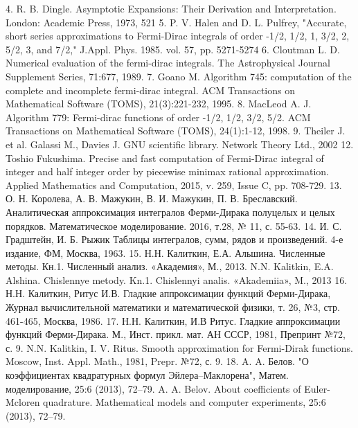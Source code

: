 4. R. B. Dingle. Asymptotic Expansions: Their Derivation and Interpretation.
London: Academic Press, 1973, 521
5. P. V. Halen and D. L. Pulfrey, "Accurate, short series approximations to
Fermi-Dirac integrals of order -1/2, 1/2, 1, 3/2, 2, 5/2, 3, and 7/2," J.Appl.
Phys. 1985. vol. 57, pp. 5271-5274
6. Cloutman L. D. Numerical evaluation of the fermi-dirac integrals. The
Astrophysical Journal Supplement Series, 71:677, 1989.
7. Goano M. Algorithm 745: computation of the complete and incomplete fermi-dirac integral. ACM Transactions on Mathematical Software (TOMS), 21(3):221-232, 1995.
8. MacLeod A. J. Algorithm 779: Fermi-dirac functions of order -1/2, 1/2, 3/2,
5/2. ACM Transactions on Mathematical Software (TOMS), 24(1):1-12,
1998.
9. Theiler J. et al. Galassi M., Davies J. GNU scientific library. Network Theory
Ltd., 2002
12. Toshio Fukushima. Precise and fast computation of Fermi-Dirac integral of
integer and half integer order by piecewise minimax rational approximation.
Applied Mathematics and Computation, 2015, v. 259, Issue C, pp. 708-729.
13. О. Н. Королева, А. В. Мажукин, В. И. Мажукин, П. В. Бреславский.
Аналитическая аппроксимация интегралов Ферми-Дирака полуцелых и
целых порядков. Математическое моделирование. 2016, т.28, № 11, с.
55-63.
14. И. С. Градштейн, И. Б. Рыжик Таблицы интегралов, сумм, рядов и
произведений. 4-е издание, ФМ, Москва, 1963.
15. Н.Н. Калиткин, Е.А. Альшина. Численные методы. Кн.1. Численный
анализ. «Академия», М., 2013. N.N. Kalitkin, E.A.
Alshina. Chislennye metody. Kn.1. Chislennyi analis. «Akademiia», M., 2013
16. Н.Н. Калиткин, Ритус И.В. Гладкие аппроксимации функций
Ферми-Дирака, Журнал вычислительной математики и математической
физики, т. 26, №3, стр. 461-465, Москва, 1986.
17. Н.Н. Калиткин, И.В Ритус. Гладкие аппроксимации функций
Ферми-Дирака. М., Инст. прикл. мат. АН СССР, 1981, Препринт №72,
с. 9.
N.N. Kalitkin, I. V. Ritus. Smooth approximation for Fermi-Dirak functions.
Moscow, Inst. Appl. Math., 1981, Prepr. №72, с. 9.
18. A. A. Белов. "О коэффициентах квадратурных формул
Эйлера–Маклорена", Матем. моделирование, 25:6 (2013), 72–79.
A. A. Belov. About coefficients of Euler-Mcloren quadrature. Mathematical
models and computer experiments, 25:6 (2013), 72–79.

